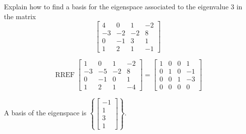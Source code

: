 
\begin{exerciseStatement}


Explain how to find a basis for the eigenspace associated to the eigenvalue \( 3 \) in the matrix \[ \left[\begin{array}{cccc}
4 & 0 & 1 & -2 \\
-3 & -2 & -2 & 8 \\
0 & -1 & 3 & 1 \\
1 & 2 & 1 & -1
\end{array}\right] \]


\end{exerciseStatement}
    
\begin{exerciseAnswer} 


\[\operatorname{RREF} \left[\begin{array}{cccc}
1 & 0 & 1 & -2 \\
-3 & -5 & -2 & 8 \\
0 & -1 & 0 & 1 \\
1 & 2 & 1 & -4
\end{array}\right] = \left[\begin{array}{cccc}
1 & 0 & 0 & 1 \\
0 & 1 & 0 & -1 \\
0 & 0 & 1 & -3 \\
0 & 0 & 0 & 0
\end{array}\right] \]



A basis of the eigenspace is \( \left\{ \left[\begin{array}{c}
-1 \\
1 \\
3 \\
1
\end{array}\right] \right\} \).


\end{exerciseAnswer}
    
